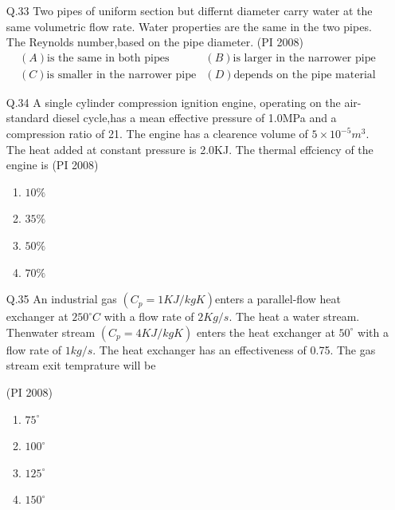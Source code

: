 \documentclass[journal,12pt,onecolumn]{IEEEtran}
\theoremstyle{remark}
\begin{document}
\begin{enumerate}
    \item[\textnormal{Q.33}]  Two pipes of uniform section but differnt diameter carry  water at the same volumetric flow rate. Water properties are the same in the two pipes. The Reynolds number,based on the pipe diameter.
    \hfill{(PI 2008)}
    \[
    \begin{matrix}
        {(A) \text{is the same in both pipes}  } & {(B)\text{is larger in the narrower pipe}}\\
        {(C)\text{is smaller in the narrower pipe}}  & {(D)\text{depends on the pipe material}}
    \end{matrix}
    \]
    \vspace{1cm}
     \item[\textnormal{Q.34}]  A single cylinder compression ignition engine, operating on the air-standard diesel cycle,has a mean effective pressure of 1.0MPa and a compression ratio of 21. The engine has a clearence volume of $5\times10^{-5}m^3$. The heat added at constant pressure is 2.0KJ. The thermal effciency of the engine is 
    \hfill{(PI 2008)}
    \begin{multicols}{4}
    \begin{enumerate}[label=(\Alph*)]
        \item $10\%$
        \item $35\%$
        \item $50\%$
        \item $70\%$
    \end{enumerate}
\end{multicols}
\vspace{1cm}
 \item[\textnormal{Q.35}]  An industrial gas $(C_p=1 KJ/kgK)$enters a parallel-flow heat exchanger at $250^{\circ}C$ with a flow rate of $2Kg/s$. The heat a water stream. Thenwater stream $(C_p=4KJ/kgK)$ enters the heat exchanger at  $50^{\circ}$ with a flow rate of $1kg/s$. The heat exchanger has an effectiveness of 0.75. The gas stream exit temprature will be 

    \hfill{(PI 2008)}
    \begin{multicols}{4}
    \begin{enumerate}[label=(\Alph*)]
        \item  $75^{\circ}$
        \item  $100^{\circ}$

        \item  $125^{\circ}$

        \item  $150^{\circ}$


\end{enumerate}
\end{multicols}
\end{enumerate}
\end{document}
